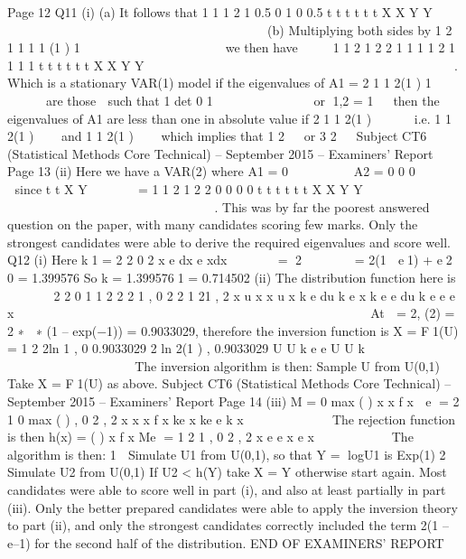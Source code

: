\documentclass[a4paper,12pt]{article}
\begin{document}
    Page 12
  Q11 (i) (a) It follows that
  1
  1
  1 2
  1 0.5 0
  1 0 0.5
  t t t
  t t t
  X X
  Y Y
  
  
          
                      
  (b) Multiplying both sides by
  1
  2
  1 1 1
  1 (1 ) 1
      
           
  we then have
     
  1
  1
  2 1 2 2
  1 1 1 1
  2 1 1 1 1
  t t t
  t t t
  X X
  Y Y
  
  
         
                       
  
  
  .
  Which is a stationary VAR(1) model if the eigenvalues of
  A1 = 2
  1 1
  2(1 ) 1
   
       
  are those  such that
  1
  det 0
  1
      
        
  or 1,2 = 1  
  then the eigenvalues of A1 are less than one in absolute value if
  2
  1 1
  2(1 )
   
  
   
  i.e.
  1 1
  2(1 )
  
   
  and
  1 1
  2(1 )
  
   
  which implies that 1
  2
    or 3
  2
   
  Subject CT6 (Statistical Methods Core Technical) – September 2015 – Examiners’ Report
  Page 13
  (ii) Here we have a VAR(2) where
  A1 =
    0
   
      
  A2 =
    0 0
  0
   
     
  since
  t
  t
  X
  Y
   
   
   
  =
    1
  1 2
  1 2 2
  0 0
  0 0
  t t t
  t t t
  X X
  Y Y
   
   
         
                      
  
  
  .
  This was by far the poorest answered question on the paper, with many
  candidates scoring few marks. Only the strongest candidates were able to
  derive the required eigenvalues and score well.
  Q12 (i) Here k1 = 2
  2
  0 2
  x
  e dx e xdx
        = 􀵆2 􀝁􀬿􁈺􀳣
  􀰮􁈻􁉃
  􀬶
  􀮶
  = 2(1  e1) + e2  0
  = 1.399576
  So k = 1.3995761 = 0.714502
  (ii) The distribution function here is
       
  2 2
  0
  1 1 2
  2
  2 1 , 0 2
  2 1 21 , 2
  x u x
  x
  u x
  k e du k e x
  k e e du k e e e x
   
      
    
        
        
    
                 
  
  
  At 􀝔 = 2, (2) = 2 ∗ 􀝇 ∗ (1 – exp(−1)) = 0.9033029, therefore the inversion
  function is
  X = F1(U) =
    1 2
  2ln 1 , 0 0.9033029
  2
  ln 2(1 ) , 0.9033029
  U U
  k
  e e U U
  k
   
             
  
              
  The inversion algorithm is then:
    Sample U from U(0,1)
  Take X = F1(U) as above.
  Subject CT6 (Statistical Methods Core Technical) – September 2015 – Examiners’ Report
  Page 14
  (iii) M =
    0
  max ( ) x x
  f x
   e
  = 2 1
  0
  max ( ) , 0 2
  , 2
  x
  x x
  f x ke x ke
  e k x
  
   
  
     
   
  The rejection function is then
  h(x) = ( )
  x
  f x
  Me =
    1 2
  1
  , 0 2
  , 2
  x
  e e x
  e x
  
  
  
    
    
  The algorithm is then:
    1  Simulate U1 from U(0,1), so that Y = logU1 is Exp(1)
  2  Simulate U2 from U(0,1)
  If U2 < h(Y) take X = Y otherwise start again.
  Most candidates were able to score well in part (i), and also at least partially
  in part (iii). Only the better prepared candidates were able to apply the
  inversion theory to part (ii), and only the strongest candidates correctly
  included the term 2(1 – e–1) for the second half of the distribution.
  END OF EXAMINERS’ REPORT
\end{document}
